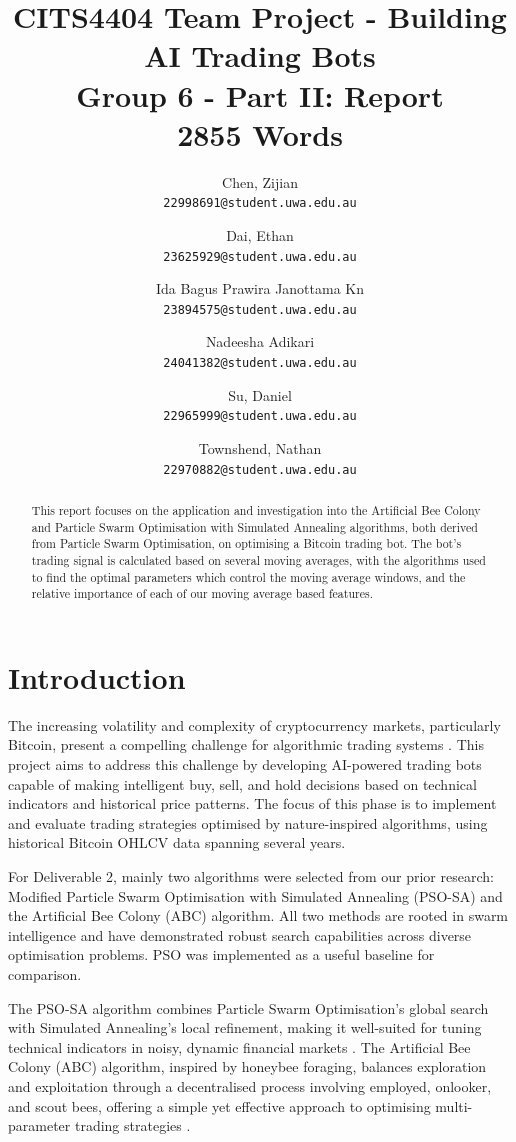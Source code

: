 \documentclass[a4paper, 12pt]{extarticle}
\title{
    CITS4404 Team Project - Building AI Trading Bots
    \\ \large Group 6 - Part II: Report
    \\ 2855 Words
}
\author{
    Chen, Zijian\\
    \normalsize \texttt{22998691@student.uwa.edu.au}
    \and
    Dai, Ethan\\
    \normalsize \texttt{23625929@student.uwa.edu.au}
    \and
    Ida Bagus Prawira Janottama Kn\\
    \normalsize \texttt{23894575@student.uwa.edu.au}
    \and
    Nadeesha Adikari\\
    \normalsize \texttt{24041382@student.uwa.edu.au}
    \and
    Su, Daniel\\
    \normalsize \texttt{22965999@student.uwa.edu.au}
    \and
    Townshend, Nathan\\
    \normalsize \texttt{22970882@student.uwa.edu.au}
}
\date{}
\begin{document}
\maketitle

\begin{abstract}
    \noindent
    This report focuses on the application and investigation into the Artificial Bee Colony and Particle Swarm Optimisation with Simulated Annealing algorithms, both derived from Particle Swarm Optimisation, on optimising a Bitcoin trading bot. The bot's trading signal is calculated based on several moving averages, with the algorithms used to find the optimal parameters which control the moving average windows, and the relative importance of each of our moving average based features.
\end{abstract}

\section{Introduction}
The increasing volatility and complexity of cryptocurrency markets, particularly Bitcoin, present a compelling challenge for algorithmic trading systems \cite{dakalbab2024artificial}. This project aims to address this challenge by developing AI-powered trading bots capable of making intelligent buy, sell, and hold decisions based on technical indicators and historical price patterns. The focus of this phase is to implement and evaluate trading strategies optimised by nature-inspired algorithms, using historical Bitcoin OHLCV data spanning several years. 

For Deliverable 2, mainly two algorithms were selected from our prior research:  Modified Particle Swarm Optimisation with Simulated Annealing (PSO-SA) and the Artificial Bee Colony (ABC) algorithm. All two methods are rooted in swarm intelligence and have demonstrated robust search capabilities across diverse optimisation problems. PSO was implemented as a useful baseline for comparison. 

The PSO-SA algorithm combines Particle Swarm Optimisation's global search with Simulated Annealing's local refinement, making it well-suited for tuning technical indicators in noisy, dynamic financial markets \cite{psosa}. The Artificial Bee Colony (ABC) algorithm, inspired by honeybee foraging, balances exploration and exploitation through a decentralised process involving employed, onlooker, and scout bees, offering a simple yet effective approach to optimising multi-parameter trading strategies \cite{abc}. 
\end{document}
